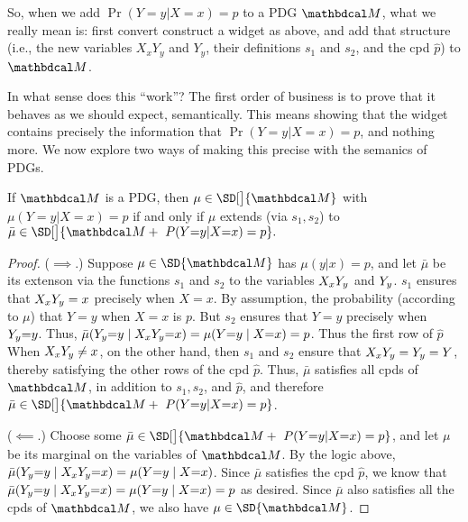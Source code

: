So, when we add $\Pr(Y=y|X=x) = p$ to a PDG $\dg M$, what we really mean is:
first convert construct a widget as above, and add that structure (i.e., the new variables
$X_xY_y$ and $Y_y$, their definitions $s_1$ and $s_2$, and the cpd $\hat p$) to $\dg M$.

In what sense does this ``work''?
The first order of business
is to prove that it behaves as we should expect,
semantically.
This means showing that the widget contains precisely the information
    that $\Pr(Y{=}y|X{=}x) = p$, and nothing more. 
We now explore two ways of making this precise with the semanics of PDGs.

\begin{prop}
    If $\dg M$ is a PDG, then 
    $
    \mu \in \SD[\big]{\dg M} 
    $ with $
    \mu(Y{=}y|X{=}x) = p
    $
    if and only if
    $
    \mu 
    $ extends (via $s_1,s_2$) to $
    \bar\mu \in \SD[\big]{\dg M + ~\Pr(Y{=}y|X{=}x) = p}.
    $
\end{prop}
\begin{proof}
    ($\implies$.)
    Suppose $\mu \in \SD{\dg M}$ has $\mu(y|x) = p$, and let $\bar\mu$ be its extenson via the functions $s_1$ and $s_2$ to the variables ${X_x Y_y}$ and ${Y_y}$. 
    $s_1$ ensures that ${X_x Y_y} = x$ precisely when $X = x$. 
    By assumption, the probability (according to $\mu$) that $Y{=}y$
    when $X{=}x$ is $p$. But $s_2$ ensures that $Y{=}y$ precisely when ${Y_y}{=}y$. 
    Thus,
    $\bar\mu({Y_y} {=} y \mid {X_x Y_y} {=} x) = \mu(Y{=}y \mid X{=}x) = p$.
    Thus the first row of $\hat p$
    When ${X_x Y_y} \ne x$, on the other hand, then $s_1$ and $s_2$ ensure
    that ${X_x Y_y} = {Y_y} = Y$, thereby satisfying the other rows 
    of the cpd $\hat p$. 
    Thus, $\bar \mu$ satisfies all cpds of $\dg M$, in addition to $s_1, s_2$, and $\hat p$, and therefore $\bar\mu \in \SD[\big]{\dg M + ~\Pr(Y{=}y|X{=}x) = p}$.
    
    ($\impliedby$.)
    Choose some $\bar\mu \in \SD[\big]{\dg M + ~\Pr(Y{=}y|X{=}x) = p}$,
    and let $\mu$ be its marginal on the variables of $\dg M$. 
    By the logic above, $\bar\mu({Y_y} {=} y \mid {X_x Y_y} {=} x) = \mu(Y{=}y \mid X{=}x)$.
    Since $\bar\mu$ satisfies the cpd $\hat p$, we know that $\bar\mu({Y_y} {=} y \mid {X_x Y_y} {=} x) = \mu(Y{=}y \mid X{=}x) = p$ as desired.
    Since $\bar\mu$ also satisfies all the cpds of $\dg M$, we also have $\mu \in \SD{\dg M}$.
\end{proof}

